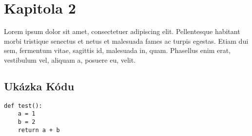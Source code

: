 \documentclass[12pt,a4paper]{article}
\let\oldsection\section
\renewcommand\section{\clearpage\oldsection}
\begin{document}
{\section{Kapitola 2}}
Lorem ipsum dolor sit amet, consectetuer adipiscing elit. Pellentesque habitant morbi tristique senectus et netus et malesuada fames ac turpis egestas. Etiam dui sem, fermentum vitae, sagittis id, malesuada in, quam. Phasellus enim erat, vestibulum vel, aliquam a, posuere eu, velit.
{\subsection{Ukázka Kódu}}
\lstset{language=Python} %
\begin{lstlisting}[frame=single]
def test():
	a = 1
	b = 2
	return a + b
\end{lstlisting}
\end{document}
